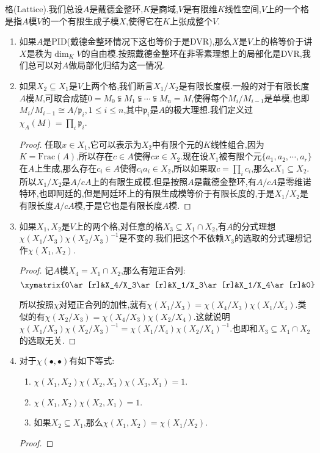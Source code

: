 格(Lattice).我们总设$A$是戴德金整环,$K$是商域,$V$是有限维$K$线性空间,$V$上的一个格是指$A$模$V$的一个有限生成子模$X$,使得它在$K$上张成整个$V$.
\begin{enumerate}
	\item 如果$A$是PID(戴德金整环情况下这也等价于是DVR),那么$X$是$V$上的格等价于讲$X$是秩为$\dim_KV$的自由模.按照戴德金整环在非零素理想上的局部化是DVR,我们总可以对$A$做局部化归结为这一情况.
	\item 如果$X_2\subseteq X_1$是$V$上两个格,我们断言$X_1/X_2$是有限长度模.一般的对于有限长度$A$模$M$,可取合成链$0=M_0\subsetneqq M_1\subsetneqq\cdots\subsetneqq M_n=M$,使得每个$M_{i}/M_{i-1}$是单模,也即$M_i/M_{i-1}\cong A/\mathfrak{p}_i,1\le i\le n$,其中$\mathfrak{p}_i$是$A$的极大理想.我们定义过$\chi_A(M)=\prod_i\mathfrak{p}_i$.
	\begin{proof}
		
		任取$x\in X_1$,它可以表示为$X_2$中有限个元的$K$线性组合,因为$K=\mathrm{Frac}(A)$,所以存在$c\in A$使得$cx\in X_2$.现在设$X_1$被有限个元$\{a_1,a_2,\cdots,a_r\}$在$A$上生成,那么存在$c_i\in A$使得$c_ia_i\in X_2$,所以如果取$c=\prod_ic_i$,那么$cX_1\subseteq X_2$.所以$X_1/X_2$是$A/cA$上的有限生成模.但是按照$A$是戴德金整环,有$A/cA$是零维诺特环,也即阿廷的,但是阿廷环上的有限生成模等价于有限长度的,于是$X_1/X_2$是有限长度$A/cA$模,于是它也是有限长度$A$模.
	\end{proof}
    \item 如果$X_1,X_2$是$V$上的两个格,对任意的格$X_3\subseteq X_1\cap X_2$,有$A$的分式理想$\chi(X_1/X_3)\chi(X_2/X_3)^{-1}$是不变的.我们把这个不依赖$X_3$的选取的分式理想记作$\chi(X_1,X_2)$.
    \begin{proof}
    	
    	记$A$模$X_4=X_1\cap X_2$,那么有短正合列:
    	$$\xymatrix{0\ar[r]&X_4/X_3\ar[r]&X_1/X_3\ar[r]&X_1/X_4\ar[r]&0}$$
    	
    	所以按照$\chi$对短正合列的加性,就有$\chi(X_1/X_3)=\chi(X_4/X_3)\chi(X_1/X_4)$.类似的有$\chi(X_2/X_3)=\chi(X_4/X_3)\chi(X_2/X_4)$.这就说明$\chi(X_1/X_3)\chi(X_2/X_3)^{-1}=\chi(X_1/X_4)\chi(X_2/X_4)^{-1}$.也即和$X_3\subseteq X_1\cap X_2$的选取无关.
    \end{proof}
    \item 对于$\chi(\bullet,\bullet)$有如下等式:
    \begin{enumerate}
    	\item $\chi(X_1,X_2)\chi(X_2,X_3)\chi(X_3,X_1)=1$.
    	\item $\chi(X_1,X_2)\chi(X_2,X_1)=1$.
    	\item 如果$X_2\subseteq X_1$,那么$\chi(X_1,X_2)=\chi(X_1/X_2)$.
    \end{enumerate}
    \begin{proof}
    	

\end{proof}
\end{enumerate}

